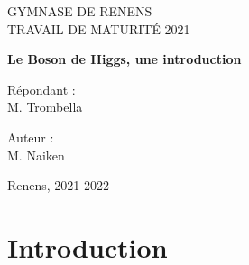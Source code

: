 \documentclass[a4paper,12pt,oneside,openright]{book} %
\begin{document}

\thispagestyle{empty}

\vspace{6cm}
\begin{center}
\begin{Large}
GYMNASE DE RENENS\\[20pt]
TRAVAIL DE MATURIT\'E 2021
\end{Large}

\vspace{7cm}
\begin{Huge}
\textbf{Le Boson de Higgs, une introduction}
\end{Huge}
\end{center}

\vspace{13.5cm}
\begin{large}
\begin{minipage}{6cm}
R\'epondant  :\\
M. Trombella
\end{minipage}
\hfill 
\begin{minipage}{6cm}
Auteur : \\
M. Naiken
\end{minipage}

\vspace{1cm}
Renens, 2021-2022
\end{large}

\newpage

\tableofcontents

\chapter*{Introduction} %
\end{document}
